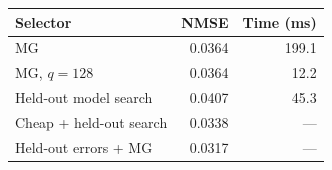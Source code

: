 \begin{tabular}{lrr}
\toprule
Selector & NMSE & Time (ms) \\
\midrule
MG & 0.0364 & 199.1 \\
MG, $q=128$ & 0.0364 & 12.2 \\
Held-out model search & 0.0407 & 45.3 \\
Cheap + held-out search & 0.0338 & --- \\
Held-out errors + MG & 0.0317 & --- \\
\bottomrule
\end{tabular}
